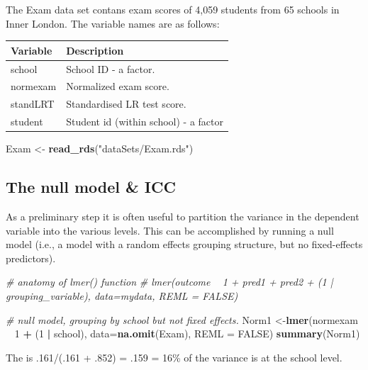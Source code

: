 \documentclass[]{book}
\newenvironment{Shaded}{\begin{snugshade}}{\end{snugshade}}
\newcommand{\CommentTok}[1]{\textcolor[rgb]{0.56,0.35,0.01}{\textit{#1}}}
\newcommand{\DataTypeTok}[1]{\textcolor[rgb]{0.13,0.29,0.53}{#1}}
\newcommand{\DecValTok}[1]{\textcolor[rgb]{0.00,0.00,0.81}{#1}}
\newcommand{\KeywordTok}[1]{\textcolor[rgb]{0.13,0.29,0.53}{\textbf{#1}}}
\newcommand{\NormalTok}[1]{#1}
\newcommand{\OperatorTok}[1]{\textcolor[rgb]{0.81,0.36,0.00}{\textbf{#1}}}
\newcommand{\OtherTok}[1]{\textcolor[rgb]{0.56,0.35,0.01}{#1}}
\newcommand{\StringTok}[1]{\textcolor[rgb]{0.31,0.60,0.02}{#1}}
\begin{document}
The Exam data set contans exam scores of 4,059 students from 65 schools in Inner London. The variable names are as follows:

\begin{longtable}[]{@{}ll@{}}
\toprule
Variable & Description\tabularnewline
\midrule
\endhead
school & School ID - a factor.\tabularnewline
normexam & Normalized exam score.\tabularnewline
standLRT & Standardised LR test score.\tabularnewline
student & Student id (within school) - a factor\tabularnewline
\bottomrule
\end{longtable}

\begin{Shaded}
\begin{Highlighting}[]
\NormalTok{  Exam <-}\StringTok{ }\KeywordTok{read_rds}\NormalTok{(}\StringTok{"dataSets/Exam.rds"}\NormalTok{)}
\end{Highlighting}
\end{Shaded}

\hypertarget{the-null-model-icc}{%
\subsection{The null model \& ICC}\label{the-null-model-icc}}

As a preliminary step it is often useful to partition the variance in the dependent variable into the various levels. This can be accomplished by running a null model (i.e., a model with a random effects grouping structure, but no fixed-effects predictors).

\begin{Shaded}
\begin{Highlighting}[]
  \CommentTok{# anatomy of lmer() function}
  \CommentTok{# lmer(outcome ~ 1 + pred1 + pred2 + (1 | grouping_variable), data=mydata, REML = FALSE)}


  \CommentTok{# null model, grouping by school but not fixed effects.}
\NormalTok{  Norm1 <-}\KeywordTok{lmer}\NormalTok{(normexam }\OperatorTok{~}\StringTok{ }\DecValTok{1} \OperatorTok{+}\StringTok{ }\NormalTok{(}\DecValTok{1} \OperatorTok{|}\StringTok{ }\NormalTok{school), }
              \DataTypeTok{data=}\KeywordTok{na.omit}\NormalTok{(Exam), }\DataTypeTok{REML =} \OtherTok{FALSE}\NormalTok{)}
  \KeywordTok{summary}\NormalTok{(Norm1)}
\end{Highlighting}
\end{Shaded}

The is .161/(.161 + .852) = .159 = 16\% of the variance is at the school level.
\end{document}
